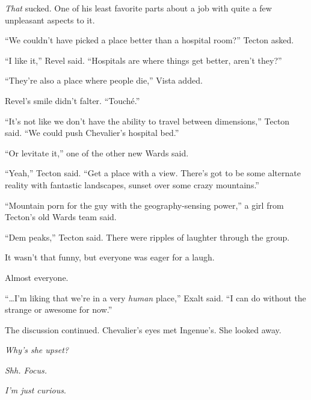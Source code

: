 \emph{That} sucked.  One of his least favorite parts about a job with quite a few unpleasant aspects to it.



``We couldn't have picked a place better than a hospital room?'' Tecton asked.



``I like it,'' Revel said.  ``Hospitals are where things get better, aren't they?''



``They're also a place where people die,'' Vista added.



Revel's smile didn't falter.  ``Touch\'{e}.''



``It's not like we don't have the ability to travel between dimensions,'' Tecton said.  ``We could push Chevalier's hospital bed.''



``Or levitate it,'' one of the other new Wards said.



``Yeah,'' Tecton said.  ``Get a place with a view.  There's got to be some alternate reality with fantastic landscapes, sunset over some crazy mountains.''



``Mountain porn for the guy with the geography-sensing power,'' a girl from Tecton's old Wards team said.



``Dem peaks,'' Tecton said.  There were ripples of laughter through the group.



It wasn't that funny, but everyone was eager for a laugh.



Almost everyone.



``\ldots{}I'm liking that we're in a very \emph{human} place,'' Exalt said.  ``I can do without the strange or awesome for now.''



The discussion continued.  Chevalier's eyes met Ingenue's.  She looked away.



\emph{Why's she upset?}



\emph{Shh.  Focus.}



\emph{I'm just curious}.



